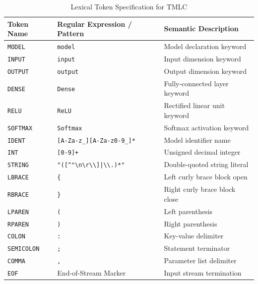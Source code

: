 \documentclass[11pt,a4paper]{article}
\begin{document}
\begin{table}[htbp]
\centering
\small
\caption{Lexical Token Specification for TMLC}
\label{tab:lexical_tokens}
\begin{tabular}{lll}
\toprule
\textbf{Token Name} & \textbf{Regular Expression / Pattern} & \textbf{Semantic Description} \\
\midrule
\texttt{MODEL}      & \texttt{model}                          & Model declaration keyword \\
\texttt{INPUT}      & \texttt{input}                          & Input dimension keyword \\
\texttt{OUTPUT}     & \texttt{output}                         & Output dimension keyword \\
\texttt{DENSE}      & \texttt{Dense}                          & Fully-connected layer keyword \\
\texttt{RELU}       & \texttt{ReLU}                           & Rectified linear unit keyword \\
\texttt{SOFTMAX}    & \texttt{Softmax}                        & Softmax activation keyword \\
\texttt{IDENT}      & \texttt{[A-Za-z\_][A-Za-z0-9\_]*}       & Model identifier name \\
\texttt{INT}        & \texttt{[0-9]+}                         & Unsigned decimal integer \\
\texttt{STRING}     & \texttt{"([\textasciicircum"\textbackslash n\textbackslash r\textbackslash\textbackslash]|\textbackslash\textbackslash.)*"} & Double-quoted string literal \\
\texttt{LBRACE}     & \texttt{\{}                             & Left curly brace block open \\
\texttt{RBRACE}     & \texttt{\}}                             & Right curly brace block close \\
\texttt{LPAREN}     & \texttt{(}                             & Left parenthesis \\
\texttt{RPAREN}     & \texttt{)}                             & Right parenthesis \\
\texttt{COLON}      & \texttt{:}                              & Key-value delimiter \\
\texttt{SEMICOLON}  & \texttt{;}                              & Statement terminator \\
\texttt{COMMA}      & \texttt{,}                              & Parameter list delimiter \\
\texttt{EOF}        & End-of-Stream Marker                    & Input stream termination \\
\bottomrule
\end{tabular}
\end{table}
\end{document}
